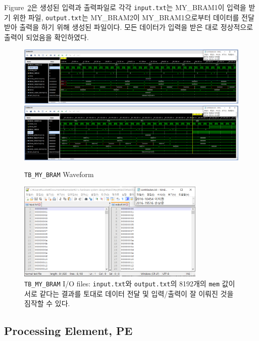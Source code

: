 \documentclass{article}
\begin{document}
Figure~\ref{fig3}은 생성된 입력과 출력파일로 각각 \texttt{input.txt}는 MY\_BRAM1이 입력을 받기 위한 파일, \texttt{output.txt}는 MY\_BRAM2이 MY\_BRAM1으로부터 데이터를 전달받아 출력을 하기 위해 생성된 파일이다. 모든 데이터가 입력을 받은 대로 정상적으로 출력이 되었음을 확인하였다.
\begin{figure}[ht]
	\centering
	\includegraphics[width=1.0\textwidth]{../../submission/My_BRAM/My_BRAM_Waveform1.png}
	\includegraphics[width=1.0\textwidth]{../../submission/My_BRAM/My_BRAM_Waveform2.png}
\caption{\texttt{TB\_MY\_BRAM} Waveform}
\label{fig2}
\end{figure}
\begin{figure}[ht]
	\centering
	\includegraphics[width=0.8\textwidth]{../../submission/My_BRAM/My_BRAM_result.png}
\caption{\texttt{TB\_MY\_BRAM} I/O files: \texttt{input.txt}와 \texttt{output.txt}의 8192개의 \texttt{mem} 값이 서로 같다는 결과를 토대로 데이터 전달 및 입력/출력이 잘 이뤄진 것을 짐작할 수 있다.}
\label{fig3}
\end{figure}

\newpage
\subsection{Processing Element, PE}
\end{document}
